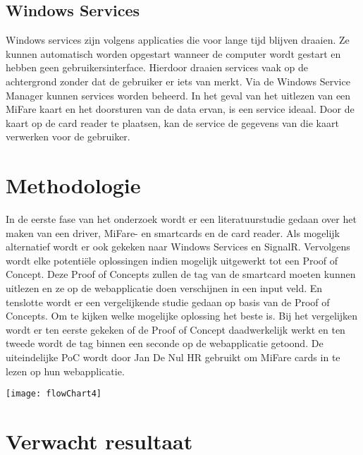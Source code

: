 \subsection{Windows Services}
Windows services zijn volgens \textcite{MicrosoftWS} applicaties die voor lange tijd blijven draaien. Ze kunnen automatisch worden opgestart wanneer de computer wordt gestart en hebben geen gebruikersinterface. Hierdoor draaien services vaak op de achtergrond zonder dat de gebruiker er iets van merkt. Via de Windows Service Manager kunnen services worden beheerd. In het geval van het uitlezen van een MiFare kaart en het doorsturen van de data ervan, is een service ideaal. Door de kaart op de card reader te plaatsen, kan de service de gegevens van die kaart verwerken voor de gebruiker.

\section{Methodologie}%
\label{sec:methodologie}

In de eerste fase van het onderzoek wordt er een literatuurstudie gedaan over het maken van een driver, MiFare- en smartcards en de card reader. Als mogelijk alternatief wordt er ook gekeken naar Windows Services en SignalR. Vervolgens wordt elke potentiële oplossingen indien mogelijk uitgewerkt tot een Proof of Concept. Deze Proof of Concepts zullen de tag van de smartcard moeten kunnen uitlezen en ze op de webapplicatie doen verschijnen in een input veld. En tenslotte wordt er een vergelijkende studie gedaan op basis van de Proof of Concepts. Om te kijken welke mogelijke oplossing het beste is. Bij het vergelijken wordt er ten eerste gekeken of de Proof of Concept daadwerkelijk werkt en ten tweede wordt de tag binnen een seconde op de webapplicatie getoond. De uiteindelijke PoC wordt door Jan De Nul HR gebruikt om MiFare cards in te lezen op hun webapplicatie. 

\begin{center}
    \texttt{[image: flowChart4]}
\end{center}

\section{Verwacht resultaat}%
\label{sec:verwachte_resultaten}

